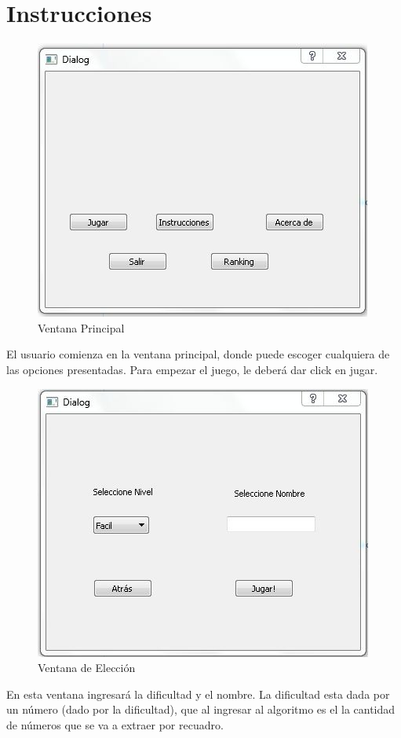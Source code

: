 \section{Instrucciones}

\begin{figure}[htbp]
\begin{center}
\includegraphics[width=.60\textwidth]{./imagenes/1.jpg}
\caption{Ventana Principal}
\label{Ventana Principal}
\end{center}
\end{figure}
El usuario comienza en la ventana principal, donde puede escoger cualquiera de las opciones presentadas. Para empezar el juego, le deberá dar click en jugar.


\begin{figure}[htbp]
\begin{center}
\includegraphics[width=.60\textwidth]{./imagenes/2.jpg}
\caption{Ventana de Elección}
\label{Ventana de Elección}
\end{center}
\end{figure}
En esta ventana ingresará la dificultad y el nombre. La dificultad esta dada por un número (dado por la dificultad), que al ingresar al algoritmo es el la cantidad de números que se va a extraer por recuadro.


